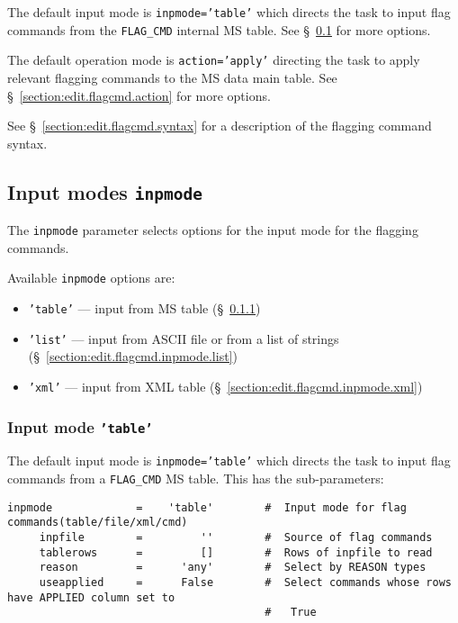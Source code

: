 The default input mode is {\tt inpmode='table'} which directs the
task to input flag commands from the {\tt FLAG\_CMD} internal MS
table. See \S~\ref{section:edit.flagcmd.inpmode} for more options.

The default operation mode is {\tt action='apply'} directing the
task to apply relevant flagging commands to the MS data main table.
See \S~\ref{section:edit.flagcmd.action} for more options.

See \S~\ref{section:edit.flagcmd.syntax} for a description of the
flagging command syntax.

\subsection{Input modes {\tt inpmode}}
\label{section:edit.flagcmd.inpmode}

The {\tt inpmode} parameter selects options for the input mode for
the flagging commands.

Available {\tt inpmode} options are:
\begin{itemize}
   \item {\tt 'table'} --- input from MS table (\S~\ref{section:edit.flagcmd.inpmode.table})
   \item {\tt 'list'} --- input from ASCII file or from a list of
     strings (\S~\ref{section:edit.flagcmd.inpmode.list})
   \item {\tt 'xml'} --- input from XML table (\S~\ref{section:edit.flagcmd.inpmode.xml})
\end{itemize}

\subsubsection{Input mode {\tt 'table'}}
\label{section:edit.flagcmd.inpmode.table}

The default input mode is {\tt inpmode='table'} which directs the
task to input flag commands from a {\tt FLAG\_CMD} MS table.  
This has the sub-parameters:
\small
\begin{verbatim}
inpmode             =    'table'        #  Input mode for flag commands(table/file/xml/cmd)
     inpfile        =         ''        #  Source of flag commands
     tablerows      =         []        #  Rows of inpfile to read
     reason         =      'any'        #  Select by REASON types
     useapplied     =      False        #  Select commands whose rows have APPLIED column set to
                                        #   True
\end{verbatim}
\normalsize

